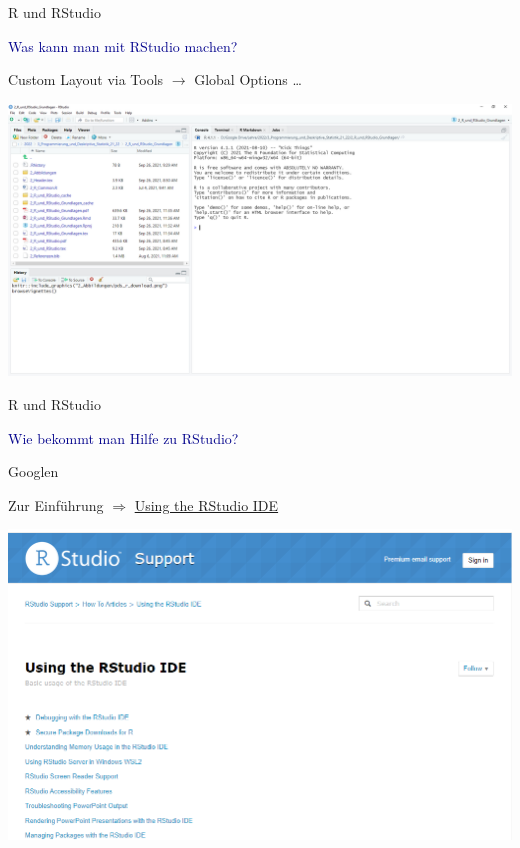 \documentclass[
  8pt,
  ignorenonframetext,
]{beamer}
\begin{document}
\begin{frame}{R und RStudio}
\protect\hypertarget{r-und-rstudio-7}{}
\large

\textcolor{darkblue}{Was kann man mit RStudio machen?} \normalsize

Custom Layout via Tools \(\rightarrow\) Global Options \ldots{}

\begin{center}\includegraphics[width=0.9\linewidth]{2_Abbildungen/pds_2_rstudio} \end{center}
\end{frame}

\begin{frame}{R und RStudio}
\protect\hypertarget{r-und-rstudio-8}{}
\large

\textcolor{darkblue}{Wie bekommt man Hilfe zu RStudio?}

\normalsize

Googlen

Zur Einführung \(\Rightarrow\)
\href{https://support.rstudio.com/hc/en-us/sections/200107586-Using-the-RStudio-IDE}{Using
the RStudio IDE}

\begin{center}\includegraphics[width=0.7\linewidth]{2_Abbildungen/pds_2_using_rstudio} \end{center}
\end{frame}
\end{document}

